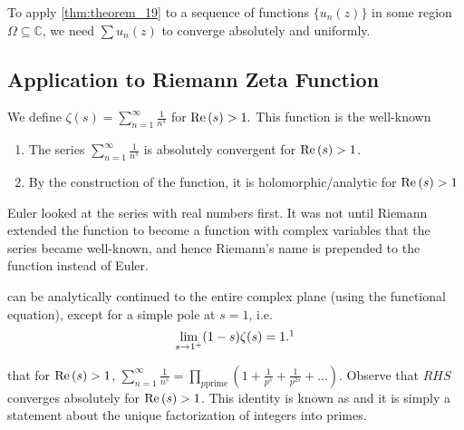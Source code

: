 \documentclass[notoc,notitlepage]{tufte-book}
\begin{document}
\begin{remark}
  To apply \cref{thm:theorem_19} to a sequence of functions $\{u_n(z)\}$ in some region $\Omega \subseteq \mathbb{C}$, we need $\sum u_n(z)$ to converge absolutely and uniformly.
\end{remark}

\subsection{Application to Riemann Zeta Function} %
\label{sub:application_to_riemann_zeta_function}

We define $\zeta (s) = \sum_{n=1}^{\infty} \frac{1}{n^s}$ for $\operatorname{Re}{(s)} > 1.$ This function is the well-known 

\begin{remark}
  \begin{enumerate}
    \item The series $\sum_{n=1}^{\infty} \frac{1}{n^s}$ is absolutely convergent for $\operatorname{Re}{(s)} > 1$.
    \item By the construction of the function, it is holomorphic/analytic for $\operatorname{Re}{(s)} > 1$
  \end{enumerate}
\end{remark}

 Euler looked at the series with real numbers first. It was not until Riemann extended the function to become a function with complex variables that the series became well-known, and hence Riemann's name is prepended to the function instead of Euler.

 can be analytically continued to the entire complex plane (using the functional equation), except for a simple pole at $s = 1$, i.e.
\begin{equation*}
  \lim_{s \to 1^+} (1 - s) \zeta (s) = 1.\footnotemark
\end{equation*}

 that for $\operatorname{Re}{(s)} > 1$, $\sum_{n=1}^{\infty} \frac{1}{n^s} = \prod_{p \text{prime}} (1 + \frac{1}{p^s} + \frac{1}{p^{2s}} + \hdots)$. Observe that $RHS$ converges absolutely for $\operatorname{Re}{(s)} > 1$. This identity is known as  and it is simply a statement about the unique factorization of integers into primes.
\end{document}
